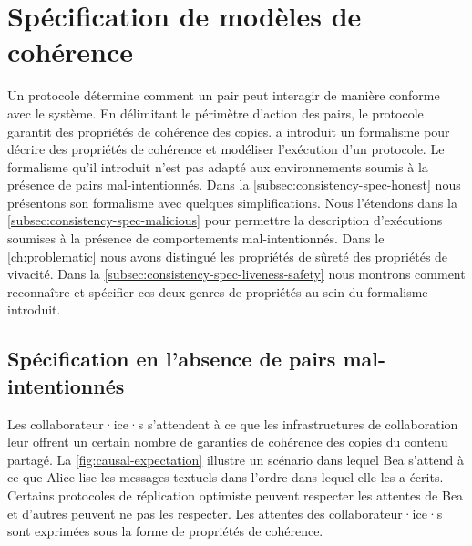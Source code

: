 \section{Spécification de modèles de cohérence}\label{sec:consistency-spec}

Un protocole détermine comment un pair peut interagir de manière conforme avec le système.
En délimitant le périmètre d'action des pairs, le protocole garantit des propriétés de cohérence des copies.
\textcite{burckhardt_eventualconsistency_2014} a introduit un formalisme pour décrire des propriétés de cohérence et modéliser l'exécution d'un protocole.
Le formalisme qu'il introduit n'est pas adapté aux environnements soumis à la présence de pairs mal-intentionnés.
Dans la \autoref{subsec:consistency-spec-honest} nous présentons son formalisme avec quelques simplifications.
Nous l'étendons dans la \autoref{subsec:consistency-spec-malicious} pour permettre la description d'exécutions soumises à la présence de comportements mal-intentionnés.
Dans le \autoref{ch:problematic} nous avons distingué les propriétés de sûreté des propriétés de vivacité.
Dans la \autoref{subsec:consistency-spec-liveness-safety} nous montrons comment reconnaître et spécifier ces deux genres de propriétés au sein du formalisme introduit.



\subsection{Spécification en l'absence de pairs mal-intentionnés}\label{subsec:consistency-spec-honest}

Les collaborateur·ice·s s'attendent à ce que les infrastructures de collaboration leur offrent un certain nombre de garanties de cohérence des copies du contenu partagé.
La \autoref{fig:causal-expectation} illustre un scénario dans lequel Bea s'attend à ce que Alice lise les messages textuels dans l'ordre dans lequel elle les a écrits.
Certains protocoles de réplication optimiste peuvent respecter les attentes de Bea et d'autres peuvent ne pas les respecter.
Les attentes des collaborateur·ice·s sont exprimées sous la forme de propriétés de cohérence.

